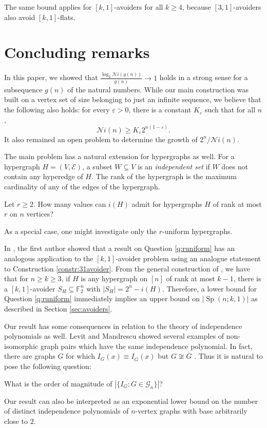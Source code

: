 \documentclass[10pt,a4paper]{article}
\numberwithin{equation}{section}
\newcommand{\ff}{\mathbb{F}}
\newcommand{\eps}{\varepsilon}
\newcommand{\cG}{\mathcal{G}}
\newcommand{\cN}{\mathcal{N}}
\newcommand{\cNi}{\mathcal{N}i}
\DeclareMathOperator{\Sp}{Sp}
\begin{document}
The same bound applies for $[k,1]$-avoiders for all $k\ge 4$, because $[3,1]$-avoiders also avoid $[k,1]$-flats.

\section{Concluding remarks}

In this paper, we showed that $\frac{\log_2\cN i(g(n))}{g(n)}\to 1$ holds in a strong sense for a subsequence $g(n)$ of the natural numbers. 
While our main construction was built on a vertex set of size belonging to just an infinite sequence, we believe that the following also holds: for every $\eps>0$, there is a constant $K_{\eps}$ such that for all $n$, $$\cNi(n)\ge K_{\eps} 2^{n(1-\eps)}.$$ 
It also remained an open problem to determine the growth of 
$2^n/\cN i(n)$.

The main problem has a natural extension for hypergraphs as well. For a hypergraph $H=(V,\mathcal{E})$, a subset $W\subseteq V$ is an  \textit{independent set} if $W$ does not contain any  hyperedge of $H$. The rank of the hypergraph is the maximum cardinality of any of the edges of the hypergraph. 

\begin{question}\label{q:runiform}
Let $r\ge 2$. How many values can $i(H)$ admit for hypergraphs $H$ of rank at most $r$ on $n$ vertices?
\end{question}

As a special case, one might investigate only the $r$-uniform hypergraphs.

In \cite{codebased}, the first author showed that a result on Question \ref{q:runiform} has an analogous application to the $[k,1]$-avoider problem using an analogue statement to Construction \ref{constr:31avoider}. From the general construction of \cite{codebased}, we have that for $n\ge k\ge 3$, if $H$ is any hypergraph on $[n]$ of rank at most $k-1$, there is a $[k,1]$-avoider $S_H\subseteq \ff_2^n$ with $|S_H|=2^n-i(H)$. Therefore, a lower bound for Question \ref{q:runiform} immediately implies an upper bound on $|\Sp(n;k,1)|$ as described in Section \ref{sec:avoiders}.

Our result has some consequences in relation to the theory of independence polynomials as well.
Levit and Mandrescu \cite{Levit2} showed several examples of non-isomorphic graph pairs which have the same independence polynomial. In fact, there are graphs $G$ for which $I_G(x) \equiv I_{\overline{G}}(x)$ but $G\not\cong\overline{G}$ \cite{Hoede}.
Thus it is natural to pose the following question:
\begin{problem}
    What is the order of magnitude of $|\{I_G: G\in \cG_n\}|$?
\end{problem}
Our result can also be interpreted as an exponential lower bound on the number of distinct independence polynomials of $n$-vertex graphs with base arbitrarily close to $2$.
\end{document}
